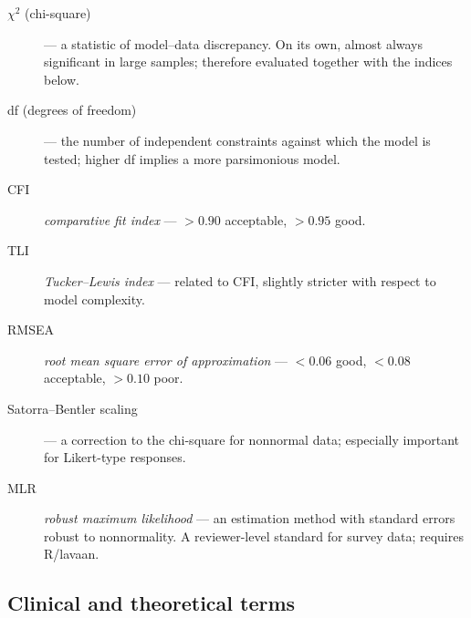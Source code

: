 \begin{description}
    \item[$\chi^2$ (chi-square)] --- a statistic of model--data discrepancy. On its own, almost always significant in large samples; therefore evaluated together with the indices below.
    \item[df (degrees of freedom)] --- the number of independent constraints against which the model is tested; higher df implies a more parsimonious model.
    \item[CFI] \textit{comparative fit index} --- $>0.90$ acceptable, $>0.95$ good.
    \item[TLI] \textit{Tucker--Lewis index} --- related to CFI, slightly stricter with respect to model complexity.
    \item[RMSEA] \textit{root mean square error of approximation} --- $<0.06$ good, $<0.08$ acceptable, $>0.10$ poor.
    \item[Satorra--Bentler scaling] --- a correction to the chi-square for nonnormal data; especially important for Likert-type responses.
    \item[MLR] \textit{robust maximum likelihood} --- an estimation method with standard errors robust to nonnormality. A reviewer-level standard for survey data; requires R/lavaan.
\end{description}

\subsection*{Clinical and theoretical terms}

